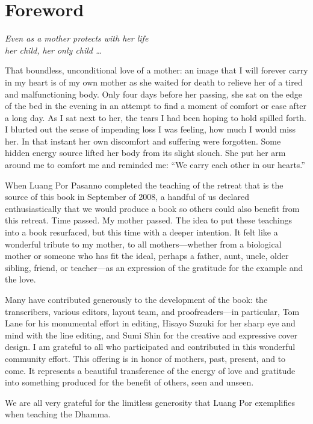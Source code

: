 \chapter{Foreword}

{\center
\emph{Even as a mother protects with her life\\her child, her only child
\ldots{}}

}

\vspace{1em}\noindent
That boundless, unconditional love of a mother: an image that I will
forever carry in my heart is of my own mother as she waited for death to
relieve her of a tired and malfunctioning body. Only four days before
her passing, she sat on the edge of the bed in the evening in an attempt
to find a moment of comfort or ease after a long day. As I sat next to
her, the tears I had been hoping to hold spilled forth. I blurted out
the sense of impending loss I was feeling, how much I would miss her. In
that instant her own discomfort and suffering were forgotten. Some
hidden energy source lifted her body from its slight slouch. She put her
arm around me to comfort me and reminded me: “We carry each other in our
hearts.”

When Luang Por Pasanno completed the teaching of the retreat that is the
source of this book in September of 2008, a handful of us declared
enthusiastically that we would produce a book so others could also
benefit from this retreat. Time passed. My mother passed. The idea to
put these teachings into a book resurfaced, but this time with a deeper
intention. It felt like a wonderful tribute to my mother, to all
mothers—whether from a biological mother or someone who has fit the
ideal, perhaps a father, aunt, uncle, older sibling, friend, or
teacher—as an expression of the gratitude for the example and the love.

Many have contributed generously to the development of the book: the
transcribers, various editors, layout team, and proofreaders—in
particular, Tom Lane for his monumental effort in editing, Hisayo Suzuki
for her sharp eye and mind with the line editing, and Sumi Shin for the
creative and expressive cover design. I am grateful to all who
participated and contributed in this wonderful community effort. This
offering is in honor of mothers, past, present, and to come. It
represents a beautiful transference of the energy of love and gratitude
into something produced for the benefit of others, seen and unseen.

We are all very grateful for the limitless generosity that Luang Por
exemplifies when teaching the Dhamma.
